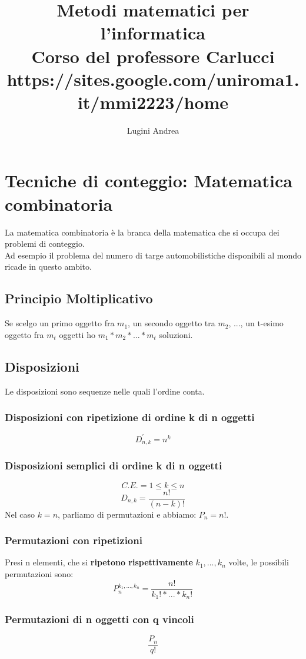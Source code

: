 \documentclass{report}
\title{%
    Metodi matematici per l'informatica \\    
    \large Corso del professore Carlucci
    \large https://sites.google.com/uniroma1.it/mmi2223/home
}
\author{Lugini Andrea}
\begin{document}
\maketitle
\tableofcontents
\newpage
\section{Tecniche di conteggio: Matematica combinatoria}
    La matematica combinatoria è la branca della matematica che si occupa dei problemi
    di conteggio. \\
    Ad esempio il problema del numero di targe automobilistiche disponibili al mondo
    ricade in questo ambito. \\
    \subsection{Principio Moltiplicativo}
        Se scelgo un primo oggetto fra $m_1$, un secondo oggetto tra $m_2$, ..., un 
        t-esimo oggetto fra $m_t$ oggetti ho $m_1 * m_2 * ... * m_t$ soluzioni.
    \subsection{Disposizioni}
    Le disposizioni sono sequenze nelle quali l'ordine conta.
        \subsubsection{Disposizioni con ripetizione di ordine k di n oggetti}
            $$D_{n,k}^{'} = n^k$$
        \subsubsection{Disposizioni semplici di ordine k di n oggetti}
            $$C.E. = 1 \leq k \leq n$$
            $$D_{n,k} = \frac{n!}{(n - k)!}$$
            Nel caso $k = n$, parliamo di permutazioni e abbiamo: $P_{n} = n!$.
        \subsubsection{Permutazioni con ripetizioni}
            Presi n elementi, che si \textbf{ripetono rispettivamente} $k_1, ..., k_n$ volte, le
            possibili permutazioni sono: 
            $$P_{n}^{k_1, ..., k_n} = \frac{n!}{k_1! * ... * k_n!}$$
        \subsubsection{Permutazioni di n oggetti con q vincoli}
            $$\frac{P_{n}}{q!}$$
\end{document}
